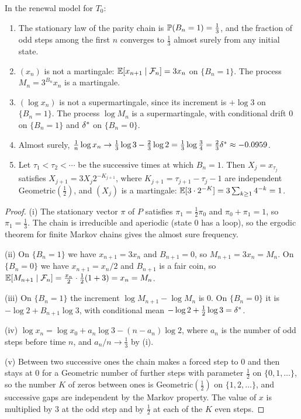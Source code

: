 \begin{proposition}\label{prop:ch3:standard}
In the renewal model for $T_0$:
\begin{enumerate}[label=(\roman*),leftmargin=2em]
\item The stationary law of the parity chain is $\mathbb{P}(B_n=1)=\tfrac13$, and
  the fraction of odd steps among the first $n$ converges to $\tfrac13$
  almost surely from any initial state.
\item $(x_n)$ is not a martingale: $\mathbb{E}[x_{n+1}\mid\mathcal{F}_n]=3x_n$ on
  $\{B_n=1\}$. The process $M_n=3^{B_n}x_n$ is a martingale.
\item $(\log x_n)$ is not a supermartingale, since its increment is $+\log3$
  on $\{B_n=1\}$. The process $\log M_n$ is a supermartingale, with
  conditional drift $0$ on $\{B_n=1\}$ and $\delta^{*}$ on $\{B_n=0\}$.
\item Almost surely, $\frac1n\log x_n\to\tfrac13\log3-\tfrac23\log2=
  \tfrac13\log\tfrac34=\tfrac23\delta^{*}\approx-0.0959$.
\item Let $\tau_1<\tau_2<\cdots$ be the successive times at which $B_n=1$.
  Then $X_j=x_{\tau_j}$ satisfies $X_{j+1}=3X_j2^{-K_{j+1}}$, where
  $K_{j+1}=\tau_{j+1}-\tau_j-1$ are independent Geometric$(\tfrac12)$, and
  $(X_j)$ is a martingale: $\mathbb{E}[3\cdot2^{-K}]=3\sum_{k\ge1}4^{-k}=1$.
\end{enumerate}
\end{proposition}

\begin{proof}
(i) The stationary vector $\pi$ of $P$ satisfies $\pi_1=\tfrac12\pi_0$ and
$\pi_0+\pi_1=1$, so $\pi_1=\tfrac13$. The chain is irreducible and aperiodic
(state $0$ has a loop), so the ergodic theorem for finite Markov chains gives
the almost sure frequency.

(ii) On $\{B_n=1\}$ we have $x_{n+1}=3x_n$ and $B_{n+1}=0$, so
$M_{n+1}=3x_n=M_n$. On $\{B_n=0\}$ we have $x_{n+1}=x_n/2$ and $B_{n+1}$ is a
fair coin, so $\mathbb{E}[M_{n+1}\mid\mathcal{F}_n]=\tfrac{x_n}{2}\cdot\tfrac12(1+3)=x_n=M_n$.

(iii) On $\{B_n=1\}$ the increment $\log M_{n+1}-\log M_n$ is $0$. On
$\{B_n=0\}$ it is $-\log2+B_{n+1}\log3$, with conditional mean
$-\log2+\tfrac12\log3=\delta^{*}$.

(iv) $\log x_n=\log x_0+a_n\log3-(n-a_n)\log2$, where $a_n$ is the number of
odd steps before time $n$, and $a_n/n\to\tfrac13$ by (i).

(v) Between two successive ones the chain makes a forced step to $0$ and then
stays at $0$ for a Geometric number of further steps with parameter
$\tfrac12$ on $\{0,1,\ldots\}$, so the number $K$ of zeros between ones is
Geometric$(\tfrac12)$ on $\{1,2,\ldots\}$, and successive gaps are independent
by the Markov property. The value of $x$ is multiplied by $3$ at the odd step
and by $\tfrac12$ at each of the $K$ even steps.
\end{proof}

